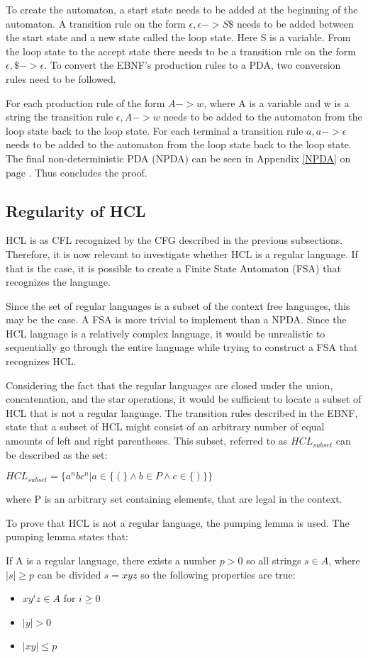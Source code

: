 To create the automaton, a start state needs to be added at the beginning of the automaton. 
A transition rule on the form $\epsilon,\epsilon->S\$$ needs to be added between the start state and a new state called the loop state.
Here S is a variable.
From the loop state to the accept state there needs to be a transition rule on the form $\epsilon,\$->\epsilon$.
To convert the EBNF's production rules to a PDA, two conversion rules need to be followed.

For each production rule of the form $A->w$, where A is a variable and w is a string the transition rule $\epsilon,A->w$ needs to be added to the automaton from the loop state back to the loop state.
For each terminal a transition rule $a,a->\epsilon$ needs to be added to the automaton from the loop state back to the loop state.
The final non-deterministic PDA (NPDA) can be seen in Appendix \ref{NPDA} on page \pageref{NPDA}.
Thus concludes the proof.

\subsection{Regularity of HCL}
HCL is as CFL recognized by the CFG described in the previous subsections.
Therefore, it is now relevant to investigate whether HCL is a regular language. 
If that is the case, it is possible to create a Finite State Automaton (FSA) that recognizes the language.

Since the set of regular languages is a subset of the context free languages, this may be the case.
A FSA is more trivial to implement than a NPDA. 
Since the HCL language is a relatively complex language, it would be unrealistic to sequentially go through the entire language while trying to construct a FSA that recognizes HCL.

Considering the fact that the regular languages are closed under the union, concatenation, and the star operations, it would be sufficient to locate a subset of HCL that is not a regular language.
The transition rules described in the EBNF, state that a subset of HCL might consist of an arbitrary number of equal amounts of left and right parentheses.
This subset, referred to as $HCL_{subset}$ can be described as the set:
\begin{center}
	$HCL_{subset} = \{a^nbc^n | a \in \{(\} \wedge b \in P \wedge c \in \{)\}\}$
\end{center}
where P is an arbitrary set containing elements, that are legal in the context.

To prove that HCL is not a regular language, the pumping lemma is used.
The pumping lemma states that:
\begin{center}
	If A is a regular language, there exists a number $p>0$ so all strings $s \in A $, where $|s| \geq p$ can be divided $s = xyz$ so the following properties are true:
	\begin{itemize}
		\item $xy^iz \in A$ for $i \geq 0$
		\item $|y| > 0$
		\item $|xy| \leq p$
	\end{itemize}
\end{center}

